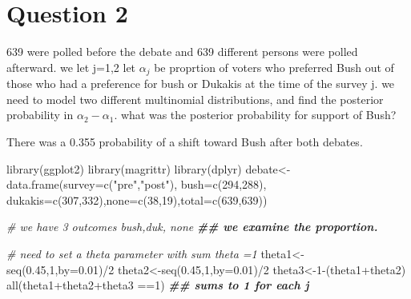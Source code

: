 \documentclass[
]{book}
\newenvironment{Shaded}{\begin{snugshade}}{\end{snugshade}}
\newcommand{\AttributeTok}[1]{\textcolor[rgb]{0.77,0.63,0.00}{#1}}
\newcommand{\CommentTok}[1]{\textcolor[rgb]{0.56,0.35,0.01}{\textit{#1}}}
\newcommand{\DecValTok}[1]{\textcolor[rgb]{0.00,0.00,0.81}{#1}}
\newcommand{\DocumentationTok}[1]{\textcolor[rgb]{0.56,0.35,0.01}{\textbf{\textit{#1}}}}
\newcommand{\FloatTok}[1]{\textcolor[rgb]{0.00,0.00,0.81}{#1}}
\newcommand{\FunctionTok}[1]{\textcolor[rgb]{0.00,0.00,0.00}{#1}}
\newcommand{\NormalTok}[1]{#1}
\newcommand{\OtherTok}[1]{\textcolor[rgb]{0.56,0.35,0.01}{#1}}
\newcommand{\SpecialCharTok}[1]{\textcolor[rgb]{0.00,0.00,0.00}{#1}}
\newcommand{\StringTok}[1]{\textcolor[rgb]{0.31,0.60,0.02}{#1}}
\theoremstyle{definition}
\theoremstyle{definition}
\theoremstyle{definition}
\theoremstyle{definition}
\theoremstyle{remark}
\begin{document}
\hypertarget{question-2}{%
\section*{Question 2}\label{question-2}}

639 were polled before the debate and 639 different persons were polled afterward. we let j=1,2 let \(\alpha_j\) be proprtion of voters who preferred Bush out of those who had a preference for bush or Dukakis at the time of the survey j. we need to model two different multinomial distributions, and find the posterior probability in \(\alpha_2-\alpha_1\). what was the posterior probability for support of Bush?

There was a 0.355 probability of a shift toward Bush after both debates.

\begin{Shaded}
\begin{Highlighting}[]
 \FunctionTok{library}\NormalTok{(ggplot2)}
 \FunctionTok{library}\NormalTok{(magrittr)}
\FunctionTok{library}\NormalTok{(dplyr)}
\NormalTok{debate}\OtherTok{\textless{}{-}}\FunctionTok{data.frame}\NormalTok{(}\AttributeTok{survey=}\FunctionTok{c}\NormalTok{(}\StringTok{"pre"}\NormalTok{,}\StringTok{"post"}\NormalTok{), }\AttributeTok{bush=}\FunctionTok{c}\NormalTok{(}\DecValTok{294}\NormalTok{,}\DecValTok{288}\NormalTok{), }\AttributeTok{dukakis=}\FunctionTok{c}\NormalTok{(}\DecValTok{307}\NormalTok{,}\DecValTok{332}\NormalTok{),}\AttributeTok{none=}\FunctionTok{c}\NormalTok{(}\DecValTok{38}\NormalTok{,}\DecValTok{19}\NormalTok{),}\AttributeTok{total=}\FunctionTok{c}\NormalTok{(}\DecValTok{639}\NormalTok{,}\DecValTok{639}\NormalTok{))}

\CommentTok{\# we have 3 outcomes bush,duk, none}
\DocumentationTok{\#\# we examine the proportion.}

\CommentTok{\# need to set a theta parameter with sum theta =1}
\NormalTok{ theta1}\OtherTok{\textless{}{-}}\FunctionTok{seq}\NormalTok{(}\FloatTok{0.45}\NormalTok{,}\DecValTok{1}\NormalTok{,}\AttributeTok{by=}\FloatTok{0.01}\NormalTok{)}\SpecialCharTok{/}\DecValTok{2}
\NormalTok{ theta2}\OtherTok{\textless{}{-}}\FunctionTok{seq}\NormalTok{(}\FloatTok{0.45}\NormalTok{,}\DecValTok{1}\NormalTok{,}\AttributeTok{by=}\FloatTok{0.01}\NormalTok{)}\SpecialCharTok{/}\DecValTok{2}
\NormalTok{ theta3}\OtherTok{\textless{}{-}}\DecValTok{1}\SpecialCharTok{{-}}\NormalTok{(theta1}\SpecialCharTok{+}\NormalTok{theta2)}
 \FunctionTok{all}\NormalTok{(theta1}\SpecialCharTok{+}\NormalTok{theta2}\SpecialCharTok{+}\NormalTok{theta3 }\SpecialCharTok{==}\DecValTok{1}\NormalTok{) }\DocumentationTok{\#\# sums to  1 for each j}
\end{Highlighting}
\end{Shaded}
\end{document}
